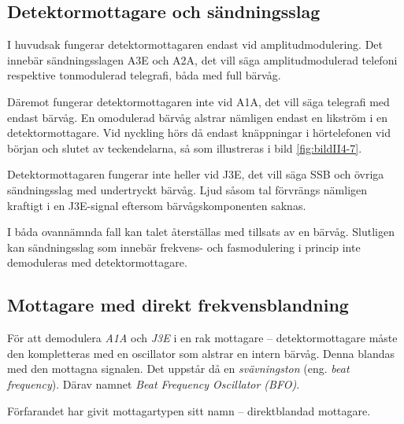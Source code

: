 
\subsection{Detektormottagare och sändningsslag}

I huvudsak fungerar detektormottagaren endast vid amplitudmodulering.
Det innebär sändningsslagen A3E och A2A, det vill säga amplitudmodulerad
telefoni respektive tonmodulerad telegrafi, båda med full bärvåg.

Däremot fungerar detektormottagaren inte vid A1A, det vill säga telegrafi med
endast bärvåg.
En omodulerad bärvåg alstrar nämligen endast en likström i en
detektormottagare.
Vid nyckling hörs då endast knäppningar i hörtelefonen vid början och
slutet av teckendelarna, så som illustreras i bild \ref{fig:bildII4-7}.

Detektormottagaren fungerar inte heller vid J3E, det vill säga SSB och övriga
sändningsslag med undertryckt bärvåg.
Ljud såsom tal förvrängs nämligen kraftigt i en J3E-signal eftersom
bärvågskomponenten saknas.

I båda ovannämnda fall kan talet återställas med tillsats av en bärvåg.
Slutligen kan sändningsslag som innebär frekvens- och fasmodulering i
princip inte demoduleras med detektormottagare.


\subsection{Mottagare med direkt frekvensblandning}

För att demodulera \emph{A1A} och \emph{J3E} i en rak mottagare --
detektormottagare måste den kompletteras med en oscillator som alstrar en
intern bärvåg.
Denna blandas med den mottagna signalen.
Det uppstår då en \emph{svävningston} (eng. \emph{beat frequency}).
Därav namnet \emph{Beat Frequency Oscillator (BFO)}.

Förfarandet har givit mottagartypen sitt namn -- direktblandad mottagare.

